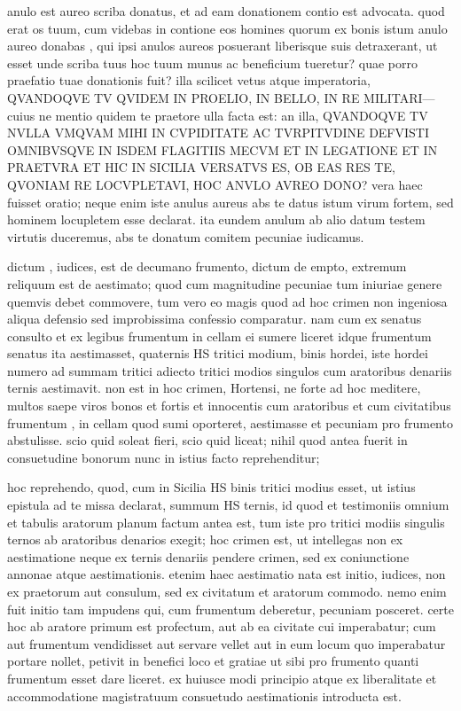  anulo est aureo scriba donatus, et ad eam donationem contio est advocata. quod erat os tuum, cum videbas in contione eos homines quorum ex bonis istum anulo aureo donabas , qui ipsi anulos aureos posuerant liberisque suis detraxerant, ut esset unde scriba tuus hoc tuum munus ac beneficium tueretur? quae porro praefatio tuae donationis fuit? illa scilicet vetus atque imperatoria, QVANDOQVE TV QVIDEM IN PROELIO, IN BELLO, IN RE MILITARI—cuius ne mentio quidem te praetore ulla facta est: an illa, QVANDOQVE TV NVLLA VMQVAM MIHI IN CVPIDITATE AC TVRPITVDINE DEFVISTI OMNIBVSQVE IN ISDEM FLAGITIIS MECVM ET IN LEGATIONE ET IN PRAETVRA ET HIC IN SICILIA VERSATVS ES, OB EAS RES TE, QVONIAM RE LOCVPLETAVI, HOC ANVLO AVREO DONO? vera haec fuisset oratio; neque enim iste anulus aureus abs te datus istum virum fortem, sed hominem locupletem esse declarat. ita eundem anulum ab alio datum testem virtutis duceremus, abs te donatum comitem pecuniae iudicamus.

 dictum , iudices, est de decumano frumento, dictum de empto, extremum reliquum est de aestimato; quod cum magnitudine pecuniae tum iniuriae genere quemvis debet commovere, tum vero eo magis quod ad hoc crimen non ingeniosa aliqua defensio sed improbissima confessio comparatur. nam cum ex senatus consulto et ex legibus frumentum in cellam ei sumere liceret idque frumentum senatus ita aestimasset, quaternis HS tritici modium, binis hordei, iste hordei numero ad summam tritici adiecto tritici modios singulos cum aratoribus denariis ternis aestimavit. non est in hoc crimen, Hortensi, ne forte ad hoc meditere, multos saepe viros bonos et fortis et innocentis cum aratoribus et cum civitatibus frumentum , in cellam quod sumi oporteret, aestimasse et pecuniam pro frumento abstulisse. scio quid soleat fieri, scio quid liceat; nihil quod antea fuerit in consuetudine bonorum nunc in istius facto reprehenditur;

 hoc reprehendo, quod, cum in Sicilia HS binis tritici modius esset, ut istius epistula ad te missa declarat, summum HS ternis, id quod et testimoniis omnium et tabulis aratorum planum factum antea est, tum iste pro tritici modiis singulis ternos ab aratoribus denarios exegit; hoc crimen est, ut intellegas non ex aestimatione neque ex ternis denariis pendere crimen, sed ex coniunctione annonae atque aestimationis. etenim haec aestimatio nata est initio, iudices, non ex praetorum aut consulum, sed ex civitatum et aratorum commodo. nemo enim fuit initio tam impudens qui, cum frumentum deberetur, pecuniam posceret. certe hoc ab aratore primum est profectum, aut ab ea civitate cui imperabatur; cum aut frumentum vendidisset aut servare vellet aut in eum locum quo imperabatur portare nollet, petivit in benefici loco et gratiae ut sibi pro frumento quanti frumentum esset dare liceret. ex huiusce modi principio atque ex liberalitate et accommodatione magistratuum consuetudo aestimationis introducta est.

